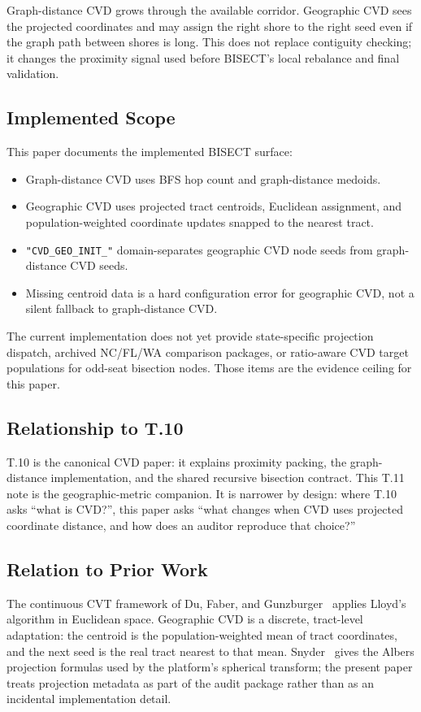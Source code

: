 Graph-distance CVD grows through the available corridor. Geographic CVD sees
the projected coordinates and may assign the right shore to the right seed
even if the graph path between shores is long. This does not replace contiguity
checking; it changes the proximity signal used before BISECT's local rebalance
and final validation.

\subsection{Implemented Scope}

This paper documents the implemented BISECT surface:

\begin{itemize}
\item Graph-distance CVD uses BFS hop count and graph-distance medoids.
\item Geographic CVD uses projected tract centroids, Euclidean assignment, and
  population-weighted coordinate updates snapped to the nearest tract.
\item \texttt{"CVD\_GEO\_INIT\_"} domain-separates geographic CVD node seeds
  from graph-distance CVD seeds.
\item Missing centroid data is a hard configuration error for geographic CVD,
  not a silent fallback to graph-distance CVD.
\end{itemize}

The current implementation does not yet provide state-specific projection
dispatch, archived NC/FL/WA comparison packages, or ratio-aware CVD target
populations for odd-seat bisection nodes. Those items are the evidence ceiling
for this paper.

\subsection{Relationship to T.10}
\label{sec:relationship-b22}

T.10 is the canonical CVD paper: it explains proximity packing, the
graph-distance implementation, and the shared recursive bisection contract.
This T.11 note is the geographic-metric companion. It is narrower by design:
where T.10 asks ``what is CVD?'', this paper asks ``what changes when CVD uses
projected coordinate distance, and how does an auditor reproduce that choice?''

\subsection{Relation to Prior Work}

The continuous CVT framework of Du, Faber, and Gunzburger~\citeyear{du1999}
applies Lloyd's algorithm in Euclidean space. Geographic CVD is a discrete,
tract-level adaptation: the centroid is the population-weighted mean of tract
coordinates, and the next seed is the real tract nearest to that mean.
Snyder~\citeyear{snyder1987} gives the Albers projection formulas used by the
platform's spherical transform; the present paper treats projection metadata as
part of the audit package rather than as an incidental implementation detail.
